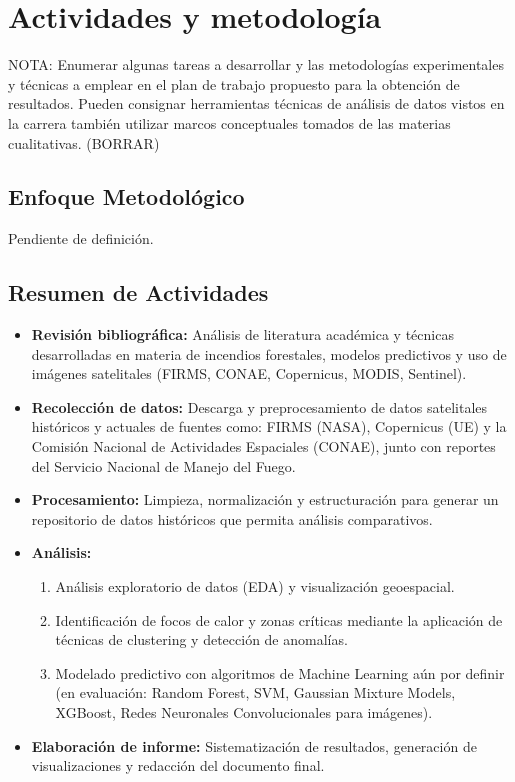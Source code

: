 \section{Actividades y metodología}
NOTA: Enumerar algunas tareas a desarrollar y las metodologías experimentales y técnicas a emplear en el plan de trabajo propuesto para la obtención de resultados. Pueden consignar herramientas técnicas de análisis de datos vistos en la carrera también utilizar marcos conceptuales tomados de las materias cualitativas. (BORRAR)

\subsection{Enfoque Metodológico}
Pendiente de definición.

\subsection{Resumen de Actividades}
\begin{itemize}
    \item \textbf{Revisión bibliográfica:} Análisis de literatura académica y técnicas desarrolladas en materia de incendios forestales, modelos predictivos y uso de imágenes satelitales (FIRMS, CONAE, Copernicus, MODIS, Sentinel). \\ 
    \item \textbf{Recolección de datos:} Descarga y preprocesamiento de datos satelitales históricos y actuales de fuentes como: FIRMS (NASA), Copernicus (UE) y la Comisión Nacional de Actividades Espaciales (CONAE), junto con reportes del Servicio Nacional de Manejo del Fuego. \\
    \item \textbf{Procesamiento:} Limpieza, normalización y estructuración para generar un repositorio de datos históricos que permita análisis comparativos. \\
    \item \textbf{Análisis:} 
        \begin{enumerate}
            \item Análisis exploratorio de datos (EDA) y visualización geoespacial.  
            \item Identificación de focos de calor y zonas críticas mediante la aplicación de técnicas de clustering y detección de anomalías.  
            \item Modelado predictivo con algoritmos de Machine Learning aún por definir (en evaluación: Random Forest, SVM, Gaussian Mixture Models, XGBoost, Redes Neuronales Convolucionales para imágenes).  \\
        \end{enumerate}
    \item \textbf{Elaboración de informe:} Sistematización de resultados, generación de visualizaciones y redacción del documento final.  
\end{itemize}